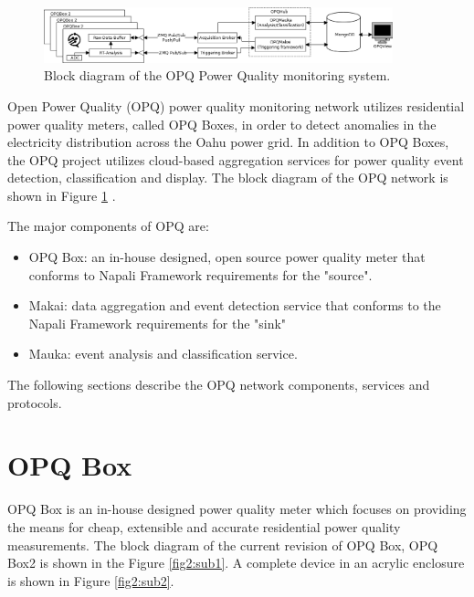 \begin{figure}[h]
  \begin{center}
  \includegraphics[width=0.9\textwidth]{img/system-diagram.png}
  \end{center}
  \caption{Block diagram of the OPQ Power Quality monitoring system.}
  \label{fig:1}
\end{figure}

Open Power Quality (OPQ) power quality monitoring network utilizes residential power quality meters, called OPQ Boxes, in order to detect anomalies in the electricity distribution across the Oahu power grid. In addition to OPQ Boxes, the OPQ project utilizes cloud-based aggregation services for power quality event detection, classification and display. The block diagram of the OPQ network is shown in Figure \ref{fig:1} .

The major components of OPQ are:
\begin {itemize}
	\item OPQ Box: an in-house designed, open source power quality meter that conforms to Napali Framework requirements for the "source".
	\item Makai: data aggregation and event detection service that conforms to the Napali Framework requirements for the "sink"
	\item Mauka: event analysis and classification service.
\end {itemize}

The following sections describe the OPQ network components, services and protocols.

\section{OPQ Box}

OPQ Box is an in-house designed power quality meter which focuses on providing the means for cheap, extensible and accurate residential power quality measurements. The block diagram of the current revision of OPQ Box, OPQ Box2 is shown in the Figure \ref{fig2:sub1}. A complete device in an acrylic enclosure is shown in Figure \ref{fig2:sub2}.


